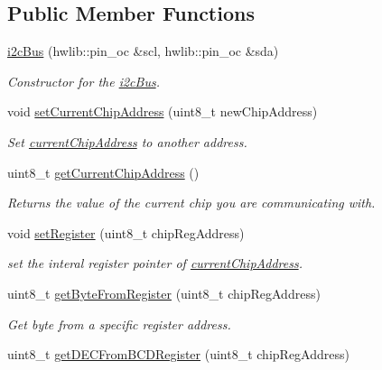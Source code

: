 \subsection*{Public Member Functions}
\begin{DoxyCompactItemize}
\item 
\mbox{\hyperlink{classi2c_bus_aa2f1a1a391410e33dc4f09c6f5b9ae7c}{i2c\+Bus}} (hwlib\+::pin\+\_\+oc \&scl, hwlib\+::pin\+\_\+oc \&sda)
\begin{DoxyCompactList}\small\item\em Constructor for the \mbox{\hyperlink{classi2c_bus}{i2c\+Bus}}. \end{DoxyCompactList}\item 
void \mbox{\hyperlink{classi2c_bus_a5f3a99851f437473a00f1216ba2a1517}{set\+Current\+Chip\+Address}} (uint8\+\_\+t new\+Chip\+Address)
\begin{DoxyCompactList}\small\item\em Set \mbox{\hyperlink{classi2c_bus_a64ff87527c88619d72ede947d73eac3a}{current\+Chip\+Address}} to another address. \end{DoxyCompactList}\item 
uint8\+\_\+t \mbox{\hyperlink{classi2c_bus_aba70817c7bc0a9ad73b369616a864395}{get\+Current\+Chip\+Address}} ()
\begin{DoxyCompactList}\small\item\em Returns the value of the current chip you are communicating with. \end{DoxyCompactList}\item 
void \mbox{\hyperlink{classi2c_bus_adee2545c8b692474b6814b4605e48ec3}{set\+Register}} (uint8\+\_\+t chip\+Reg\+Address)
\begin{DoxyCompactList}\small\item\em set the interal register pointer of \mbox{\hyperlink{classi2c_bus_a64ff87527c88619d72ede947d73eac3a}{current\+Chip\+Address}}. \end{DoxyCompactList}\item 
uint8\+\_\+t \mbox{\hyperlink{classi2c_bus_a7f83afc0264e758214db63cca336846d}{get\+Byte\+From\+Register}} (uint8\+\_\+t chip\+Reg\+Address)
\begin{DoxyCompactList}\small\item\em Get byte from a specific register address. \end{DoxyCompactList}\item 
uint8\+\_\+t \mbox{\hyperlink{classi2c_bus_a30d44d89d2f9b0d290cb2a207f6a4777}{get\+D\+E\+C\+From\+B\+C\+D\+Register}} (uint8\+\_\+t chip\+Reg\+Address)

\end{DoxyCompactItemize}

